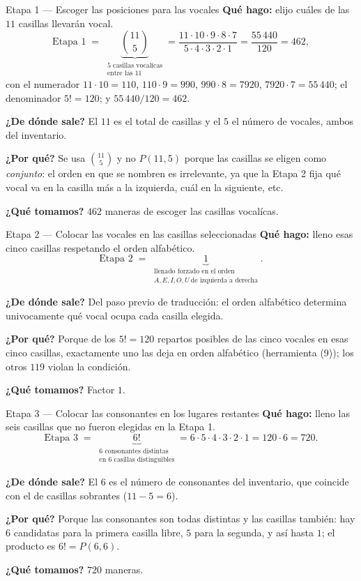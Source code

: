 \documentclass[11pt]{article}
\begin{document}
\begin{paso}{Etapa 1 --- Escoger las posiciones para las vocales}
\textbf{Qu\'e hago:} elijo cu\'ales de las $11$ casillas llevar\'an vocal.
\[
\text{Etapa 1}\;=\;\underbrace{\binom{11}{5}}_{\substack{\text{5 casillas vocal\'icas}\\ \text{entre las 11}}}
=\frac{11\cdot10\cdot9\cdot8\cdot7}{5\cdot4\cdot3\cdot2\cdot1}=\frac{55\,440}{120}=462 ,
\]
con el numerador $11\cdot 10=110$, $110\cdot 9=990$, $990\cdot 8=7920$, $7920\cdot 7=55\,440$; el
denominador $5!=120$; y $55\,440/120=462$.

\textbf{¿De d\'onde sale?} El $11$ es el total de casillas y el $5$ el n\'umero de vocales, ambos del
inventario.

\textbf{¿Por qu\'e?} Se usa $\binom{11}{5}$ y no $P(11,5)$ porque las casillas se eligen como
\emph{conjunto}: el orden en que se nombren es irrelevante, ya que la Etapa 2 fija qu\'e vocal va en la
casilla m\'as a la izquierda, cu\'al en la siguiente, etc.

\textbf{¿Qu\'e tomamos?} $462$ maneras de escoger las casillas vocal\'icas.
\end{paso}

\begin{paso}{Etapa 2 --- Colocar las vocales en las casillas seleccionadas}
\textbf{Qu\'e hago:} lleno esas cinco casillas respetando el orden alfab\'etico.
\[
\text{Etapa 2}\;=\;\underbrace{1}_{\substack{\text{llenado forzado en el orden}\\ A,E,I,O,U\ \text{de izquierda a derecha}}} .
\]

\textbf{¿De d\'onde sale?} Del paso previo de traducci\'on: el orden alfab\'etico determina univocamente
qu\'e vocal ocupa cada casilla elegida.

\textbf{¿Por qu\'e?} Porque de los $5!=120$ repartos posibles de las cinco vocales en esas cinco casillas,
exactamente uno las deja en orden alfab\'etico (herramienta (9)); los otros $119$ violan la condici\'on.

\textbf{¿Qu\'e tomamos?} Factor $1$.
\end{paso}

\begin{paso}{Etapa 3 --- Colocar las consonantes en los lugares restantes}
\textbf{Qu\'e hago:} lleno las seis casillas que no fueron elegidas en la Etapa 1.
\[
\text{Etapa 3}\;=\;\underbrace{6!}_{\substack{\text{6 consonantes distintas}\\ \text{en 6 casillas distinguibles}}}
=6\cdot5\cdot4\cdot3\cdot2\cdot1=120\cdot 6=720 .
\]

\textbf{¿De d\'onde sale?} El $6$ es el n\'umero de consonantes del inventario, que coincide con el de
casillas sobrantes ($11-5=6$).

\textbf{¿Por qu\'e?} Porque las consonantes son todas distintas y las casillas tambi\'en: hay $6$ candidatas
para la primera casilla libre, $5$ para la segunda, y as\'i hasta $1$; el producto es $6!=P(6,6)$.

\textbf{¿Qu\'e tomamos?} $720$ maneras.
\end{paso}
\end{document}
